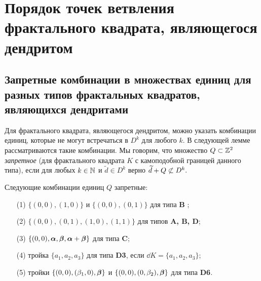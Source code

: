 

\section{Порядок точек ветвления фрактального квадрата, являющегося дендритом}

\subsection{Запретные комбинации в множествах единиц для разных типов фрактальных квадратов, являющихся дендритами}

Для фрактального квадрата, являющегося дендритом, можно указать комбинации единиц, которые не могут встречаться в $D^k$ для любого $k$. 
В следующей лемме рассматриваются такие комбинации. 
Мы говорим, что множество $Q\subset \mathbb{Z}^2$ {\em  запретное} (для фрактального квадрата $K$ с камоподобной границей данного типа), если для любых $k\in\mathbb{N}$ и $\widetilde d\in D^k$ верно
$\widetilde d+Q\not\subset D^k.$

\begin{lemma}\label{quadruples}
Следующие комбинации единиц $Q$ запретные:
\begin{itemize}[nolistsep]
\item[(1)] $\{(0,0), (1,0)\} $ и $\{(0,0), (0,1)\} $ для типа {\bf B} ;
\item[(2)] $\{(0,0), (0,1), (1,0), (1,1)\}$ для типов {\bf A, B, D};
\item[(3)] $\{(0,0),{\bm{\alpha}},{\bm{\beta}},{\bm{\alpha}}+{\bm{\beta}}\}$ для типа {\bf C};
\item[(4)] тройка $\{a_1, a_2, a_3\}$ для типа {\bf D3}, если $\dd K=\{a_1,a_2, a_3\}$;
\item[(5)] тройки $\{(0,0),(\beta_1,0),{\bm{\beta}}\}$ и $\{(0,0),(0,\beta_2),{\bm{\beta}}\}$ для типа {\bf D6}. 
\end{itemize}
\end{lemma}

